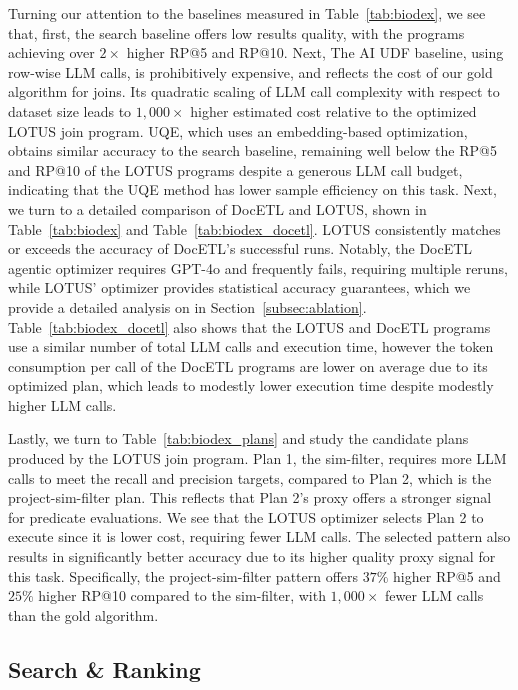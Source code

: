 Turning our attention to the baselines measured in Table~\ref{tab:biodex}, we see that, first, the search baseline offers low results quality, with the \sys programs achieving over $2\times$ higher RP@5 and RP@10. 
Next, The AI UDF baseline, using row-wise LLM calls, is prohibitively expensive, and reflects the cost of our gold algorithm for joins. Its quadratic scaling of LLM call complexity with respect to dataset size leads to $1,000\times$ higher estimated cost relative to the optimized LOTUS join program. UQE, which uses an embedding-based optimization, obtains similar accuracy to the search baseline, remaining well below the RP@5 and RP@10 of the LOTUS programs despite a generous LLM call budget, indicating that the UQE method has lower sample efficiency on this task. 
Next, we turn to a detailed comparison of DocETL and LOTUS, shown in Table~\ref{tab:biodex} and Table~\ref{tab:biodex_docetl}. 
LOTUS consistently matches or exceeds the accuracy of DocETL's successful runs. Notably, the DocETL agentic optimizer requires GPT-4o and frequently fails, requiring multiple reruns, while LOTUS' optimizer provides statistical accuracy guarantees, which we provide a detailed analysis on in Section~\ref{subsec:ablation}. Table~\ref{tab:biodex_docetl} also shows that the LOTUS and DocETL programs use a similar number of total LLM calls and execution time, however the token consumption per call of the DocETL programs are lower on average due to its optimized plan, which leads to modestly lower execution time despite modestly higher LLM calls.




Lastly, we turn to Table~\ref{tab:biodex_plans} and study the candidate plans produced by the LOTUS join program. Plan 1, the sim-filter, requires more LLM calls to meet the recall and precision targets, compared to Plan 2, which is the project-sim-filter plan. This reflects that Plan 2's proxy offers a stronger signal for predicate evaluations. We see that the LOTUS optimizer selects Plan 2 to execute since it is lower cost, requiring fewer LLM calls. The selected pattern also results in significantly better accuracy due to its higher quality proxy signal for this task. Specifically, the project-sim-filter pattern offers $37\%$ higher RP@5 and $25\%$ higher RP@10 compared to the sim-filter, with $1,000\times$ fewer LLM calls than the gold algorithm. 

\subsection{Search \& Ranking}
\label{subsec:search}

